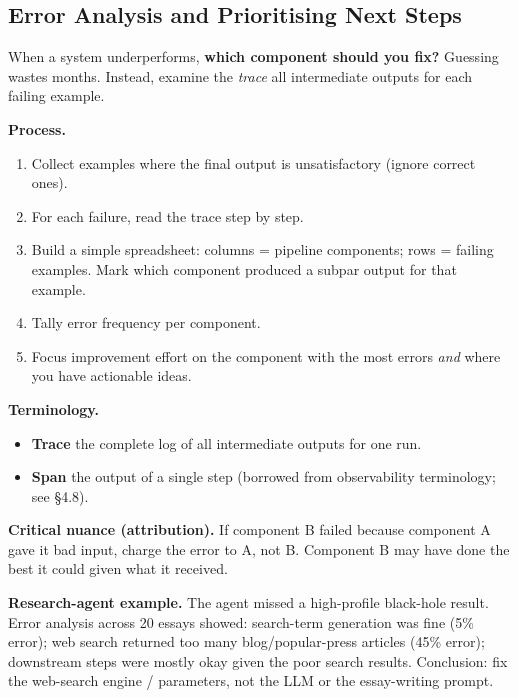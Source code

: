 \documentclass[a4paper,11pt]{article}
\begin{document}
\subsection{Error Analysis and Prioritising Next Steps}

When a system underperforms, \textbf{which component should you
fix?} Guessing wastes months. Instead, examine the \textit{trace}
\textemdash{} all intermediate outputs \textemdash{} for each
failing example.

\textbf{Process.}
\begin{enumerate}[noitemsep, leftmargin=1.4em]
  \item Collect examples where the final output is unsatisfactory
        (ignore correct ones).
  \item For each failure, read the trace step by step.
  \item Build a simple spreadsheet: columns = pipeline components;
        rows = failing examples. Mark which component produced a
        subpar output for that example.
  \item Tally error frequency per component.
  \item Focus improvement effort on the component with the most
        errors \emph{and} where you have actionable ideas.
\end{enumerate}

\textbf{Terminology.}
\begin{itemize}[noitemsep, leftmargin=1.2em]
  \item \textbf{Trace} \textemdash{} the complete log of all
        intermediate outputs for one run.
  \item \textbf{Span} \textemdash{} the output of a single step
        (borrowed from observability terminology; see §4.8).
\end{itemize}

\textbf{Critical nuance (attribution).} If component B failed because
component A gave it bad input, charge the error to A, not B.
Component B may have done the best it could given what it received.

\begin{ambercallout}
\textbf{Research-agent example.}
The agent missed a high-profile black-hole result. Error analysis
across 20 essays showed: search-term generation was fine (5\%
error); web search returned too many blog/popular-press articles
(45\% error); downstream steps were mostly okay given the poor
search results. Conclusion: fix the web-search engine / parameters,
not the LLM or the essay-writing prompt.
\end{ambercallout}
\end{document}
